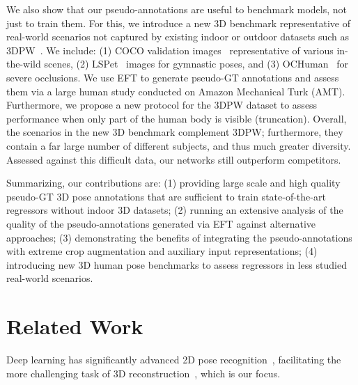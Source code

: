 \documentclass[10pt,twocolumn,letterpaper]{article}
\begin{document}
We also show that our pseudo-annotations are useful to benchmark models, not just to train them.
	For this, we introduce a new 3D benchmark representative of real-world scenarios not captured by existing indoor or outdoor datasets such as 3DPW~\cite{vonMarcard2018}.
	We include:
	(1) COCO validation images~\cite{lin2014microsoft} representative of various in-the-wild scenes,
	(2) LSPet~\cite{Johnson11} images for gymnastic poses, and
	(3) OCHuman~\cite{pose2seg2019} for severe occlusions.
We use EFT to generate pseudo-GT annotations and assess them via a large human study conducted on Amazon Mechanical Turk (AMT).
	Furthermore, we propose a new protocol for the 3DPW dataset to assess performance when only part of the human body is visible (truncation).
	Overall, the scenarios in the new 3D benchmark complement 3DPW\@; furthermore, they contain a far large number of different subjects, and thus much greater diversity.
	Assessed against this difficult data, our networks still outperform competitors.
	
	Summarizing, our contributions are:
	(1) providing large scale and high quality pseudo-GT 3D pose annotations that are sufficient to train state-of-the-art regressors without indoor 3D datasets;
	(2) running an extensive analysis of the quality of the pseudo-annotations generated via EFT against alternative approaches;
	(3) demonstrating the benefits of integrating the pseudo-annotations with extreme crop augmentation and auxiliary input representations;
	(4) introducing new 3D human pose benchmarks to assess regressors in less studied real-world scenarios.
	
	
\section{Related Work}
	
	Deep learning has significantly advanced 2D pose recognition~\cite{cao2017realtime,cao2018openpose,Wei2016,Newell-16,xiao2018simple,sun2019deep}, facilitating the more challenging task of 3D reconstruction~\cite{tan17indirect,Tung2017,martinez2017simple,pavlakos2017coarse,pavlakos2018ordinal,omran18neural,pavlakos18learning,kanazawa2018end,kolotouros19convolutional,xiang2019monocular, Cheng_2019_ICCV, sun2019human, song2020human, ExPose:2020, moon2020i2l, choi2020pose2mesh}, which is our focus.
	
\end{document}
